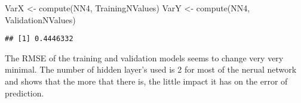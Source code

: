 \documentclass[
]{article}
\newenvironment{Shaded}{\begin{snugshade}}{\end{snugshade}}
\newcommand{\FunctionTok}[1]{\textcolor[rgb]{0.00,0.00,0.00}{#1}}
\newcommand{\NormalTok}[1]{#1}
\newcommand{\OtherTok}[1]{\textcolor[rgb]{0.56,0.35,0.01}{#1}}
\newcommand{\SpecialCharTok}[1]{\textcolor[rgb]{0.00,0.00,0.00}{#1}}
\begin{document}
\begin{Shaded}
\begin{Highlighting}[]
\NormalTok{VarX }\OtherTok{\textless{}{-}} \FunctionTok{compute}\NormalTok{(NN4, TrainingNValues)}
\NormalTok{VarY }\OtherTok{\textless{}{-}} \FunctionTok{compute}\NormalTok{(NN4, ValidationNValues)}
\end{Highlighting}
\end{Shaded}

\begin{Shaded}
\end{Shaded}

\begin{verbatim}
## [1] 0.4446332
\end{verbatim}

\begin{Shaded}
\end{Shaded}

The RMSE of the training and validation models seems to change very very
minimal. The number of hidden layer's used is 2 for most of the nerual
network and shows that the more that there is, the little impact it has
on the error of prediction.
\end{document}
